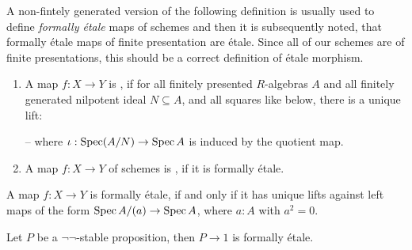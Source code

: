 
A non-fintely generated version of the following definition is usually used to define \emph{formally étale} maps of schemes and then it is subsequently noted,
that formally étale maps of finite presentation are étale.
Since all of our schemes are of finite presentations, this should be a correct definition of étale morphism.

\begin{definition}
  \begin{enumerate}
  \item   A map $f:X\to Y$ is ,
    if for all finitely presented $R$-algebras $A$ and all finitely generated nilpotent ideal $N\subseteq A$,
    and all squares like below, there is a unique lift:
    \begin{center}
    \end{center}
    -- where $\iota:\operatorname{Spec} (A/N)\to \operatorname{Spec} A$ is induced by the quotient map.
  \item A map $f:X\to Y$ of schemes is , if it is formally étale.
  \end{enumerate}
\end{definition}

\begin{lemma}%
  A map $f:X\to Y$ is formally étale,
  if and only if it has unique lifts against left maps of the form $\operatorname{Spec} A/(a)\to \operatorname{Spec} A$,
  where $a:A$ with $a^2=0$.
\end{lemma}

\begin{proposition}%
  Let $P$ be a $\neg\neg$-stable proposition,
  then $P\to 1$ is formally étale.
\end{proposition}

